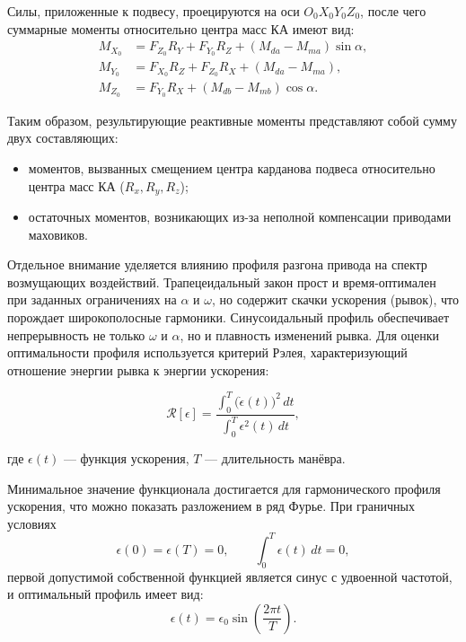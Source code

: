 Силы, приложенные к подвесу, проецируются на оси $O_0X_0Y_0Z_0$, после чего суммарные моменты относительно центра масс КА имеют вид:
\begin{equation}
	\begin{aligned}
		M_{X_0} &= F_{Z_0}R_Y + F_{Y_0}R_Z + (M_{da}-M_{ma})\sin\alpha, \\
		M_{Y_0} &= F_{X_0}R_Z + F_{Z_0}R_X + (M_{da}-M_{ma}), \\
		M_{Z_0} &= F_{Y_0}R_X + (M_{db}-M_{mb})\cos\alpha.
	\end{aligned}
\end{equation}

Таким образом, результирующие реактивные моменты представляют собой сумму двух составляющих: 
\begin{itemize}
	\item моментов, вызванных смещением центра карданова подвеса относительно центра масс КА ($R_x, R_y, R_z$);
	\item остаточных моментов, возникающих из-за неполной компенсации приводами маховиков.
\end{itemize}


Отдельное внимание уделяется влиянию профиля разгона привода на спектр возмущающих воздействий. Трапецеидальный закон прост и время-оптимален при заданных ограничениях на $\alpha$ и $\omega$, но содержит скачки ускорения (рывок), что порождает широкополосные гармоники. Синусоидальный профиль обеспечивает непрерывность не только $\omega$ и $\alpha$, но и плавность изменений рывка. 
Для оценки оптимальности профиля используется критерий Рэлея, характеризующий отношение энергии рывка к энергии ускорения:

\begin{equation}
	\label{eq:relay}
	\mathcal{R}[\epsilon] =
	\frac{\displaystyle \int_{0}^{T} \bigl(\dot{\epsilon}(t)\bigr)^{2}\,dt}
	{\displaystyle \int_{0}^{T} \epsilon^{2}(t)\,dt},
\end{equation}

где $\epsilon(t)$ --- функция ускорения, $T$ --- длительность манёвра.

Минимальное значение функционала достигается для гармонического профиля ускорения, что можно показать разложением в ряд Фурье. 
При граничных условиях
\begin{equation}
	\epsilon(0) = \epsilon(T) = 0, 
	\qquad 
	\int_{0}^{T} \epsilon(t)\,dt = 0,
\end{equation}
первой допустимой собственной функцией является синус с удвоенной частотой, и оптимальный профиль имеет вид:
\begin{equation}
	\epsilon(t) = \epsilon_0 \sin\!\left(\frac{2\pi t}{T}\right).
\end{equation}

